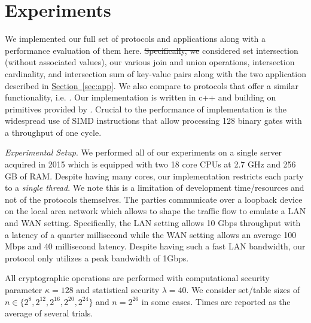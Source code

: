 \documentclass[11pt,letterpaper]{article}
\newcommand{\namedref}[2]{\hyperref[#2]{#1~\ref*{#2}}}
\newcommand{\sectionref}[1]{\namedref{Section}{#1}}
\renewcommand{\paragraph}[1]{\vspace{0.1cm}\noindent\emph{#1}.} %
\providecommand{\DIFaddtex}[1]{{\protect\color{blue}\uwave{#1}}} %
\providecommand{\DIFdeltex}[1]{{\protect\color{red}\sout{#1}}}                      %
\providecommand{\DIFaddbegin}{} %
\providecommand{\DIFaddend}{} %
\providecommand{\DIFdelbegin}{} %
\providecommand{\DIFdelend}{} %
\providecommand{\DIFadd}[1]{\texorpdfstring{\DIFaddtex{#1}}{#1}} %
\providecommand{\DIFdel}[1]{\texorpdfstring{\DIFdeltex{#1}}{}} %
\begin{document}
 

\section{Experiments}\label{sec:eval}


We implemented our full set of protocols and applications along with a performance evaluation of them here. \DIFdelbegin \DIFdel{Specifically, we }\DIFdelend \DIFaddbegin \DIFadd{They will be open source. We }\DIFaddend considered set intersection (without associated values), our various join and union operations, intersection cardinality, and intersection sum of key-value pairs along with the two application described in \sectionref{sec:app}. We also compare to protocols that offer a similar functionality, i.e. \cite{CCS:KKRT16, PSWW18,ASIACCS:BlaAgu12,DBLP:conf/cans/CristofaroGT12,cryptoeprint:2017:738}. Our implementation is written in c++ and building on primitives provided by \cite{libOTe}. Crucial to the performance of implementation is the widespread use of SIMD instructions that allow processing 128 binary gates with a throughput of one cycle.



\paragraph{Experimental Setup} We performed all of our experiments on a single server acquired in 2015 which is equipped with two 18 core CPUs at 2.7 GHz and 256 GB of RAM. Despite having many cores, our implementation restricts each party to a \emph{single thread}. We note this is a limitation of development time/resources and not of the protocols themselves. The parties communicate over a loopback device on the local area network which allows to shape the traffic flow to emulate a LAN and WAN setting. Specifically, the LAN setting allows 10 Gbps throughput with a latency of a quarter millisecond while the WAN setting allows an average 100 Mbps and 40 millisecond latency. Despite having such a fast LAN bandwidth, our protocol only utilizes a peak bandwidth of 1Gbps. 

All cryptographic operations are performed with computational security parameter $\kappa=128$ and statistical security $\lambda=40$. We consider set/table sizes of $n\in\{2^8, 2^{12}, 2^{16}, 2^{20}, 2^{24}\}$ and $n=2^{26}$ in some cases. Times are reported as the average of several trials.
\end{document}
